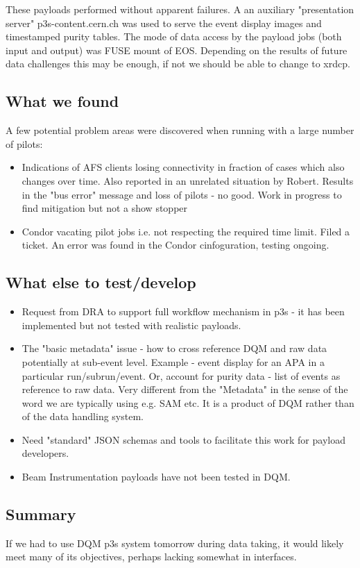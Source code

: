 \documentclass[pdftex,12pt,letter]{article}
\begin{document}
These payloads performed without apparent failures. A an auxiliary "presentation server" p3s-content.cern.ch was used to serve the event display images and timestamped purity tables.
The mode of data access by the payload jobs (both input and output) was FUSE mount of EOS. Depending on the results of future data challenges this may be enough, if not we should be able to change to xrdcp.
\subsection{What we found}
A few potential problem areas were discovered when running with a large number of pilots:
\begin{itemize}
\item Indications of AFS clients losing connectivity in fraction of cases which also changes over time. Also reported in an unrelated situation by Robert. Results in the "bus error" message and loss of pilots - no good. Work in progress to find mitigation but not a show stopper
\item Condor vacating pilot jobs i.e. not respecting the required time limit. Filed a ticket. An error was found in the Condor cinfoguration, testing ongoing.
\end{itemize}

 
\subsection{What else to test/develop}

\begin{itemize}
\item Request from DRA to support full workflow mechanism in p3s - it has been implemented but not tested with realistic payloads.
\item The "basic metadata" issue - how to cross reference DQM and raw data potentially at sub-event level. Example - event display for an APA in a particular run/subrun/event. Or, account for purity data - list of events as reference to raw data.
Very different from the "Metadata" in the sense of the word we are typically using e.g. SAM etc. It is a product of DQM rather than of the data handling system.
\item Need "standard" JSON schemas and tools to facilitate this work for payload developers.
\item Beam Instrumentation payloads have not been tested in DQM.
\end{itemize}

\subsection{Summary}
If we had to use DQM p3s system tomorrow during data taking, it would likely meet many of its objectives, perhaps lacking somewhat in interfaces.
 
\end{document}
